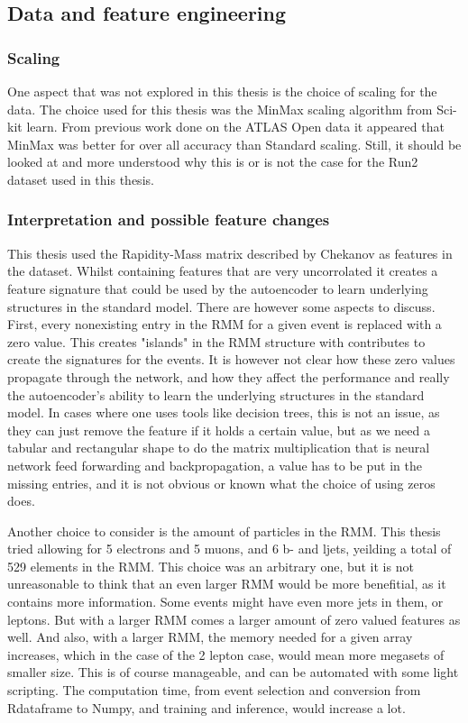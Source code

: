 \subsection*{Data and feature engineering}
\subsubsection*{Scaling}
One aspect that was not explored in this thesis is the choice of scaling for the data. The choice used for this 
thesis was the MinMax scaling algorithm from Sci-kit learn. From previous work done on the ATLAS Open data 
\cite{ATL-OREACH-PUB-2020-001} it appeared that MinMax was better for over all accuracy than Standard scaling.
Still, it should be looked at and more understood why this is or is not the case for the Run2 dataset used in this 
thesis. 

\subsubsection*{Interpretation and possible feature changes}
This thesis used the Rapidity-Mass matrix described by Chekanov\cite{Chekanov_2019} as features in the dataset. 
Whilst containing features that are very uncorrolated it creates a feature signature that could be used by 
the autoencoder to learn underlying structures in the standard model. There are however some aspects to discuss. 
First, every nonexisting entry in the RMM for a given event is replaced with a zero value. This creates 
"islands" in the RMM structure with contributes to create the signatures for the events. It is however not clear 
how these zero values propagate through the network, and how they affect the performance and really the autoencoder's 
ability to learn the underlying structures in the standard model. In cases where one uses tools like decision trees, 
this is not an issue, as they can just remove the feature if it holds a certain value, but as we need a tabular and 
rectangular shape to do the matrix multiplication that is neural network feed forwarding and backpropagation, a value
has to be put in the missing entries, and it is not obvious or known what the choice of using zeros does. \par 
Another choice to consider is the amount of particles in the RMM. This thesis tried allowing for 5 electrons and 5 muons, 
and 6 b- and ljets, yeilding a total of 529 elements in the RMM. This choice was an arbitrary one, but it is not 
unreasonable to think that an even larger RMM would be more benefitial, as it contains more information. Some 
events might have even more jets in them, or leptons. But with a larger RMM comes a larger amount of zero valued 
features as well. And also, with a larger RMM, the memory needed for a given array increases, which in the case of
the 2 lepton case, would mean more megasets of smaller size. This is of course manageable, and can be automated with 
some light scripting. The computation time, from event selection and conversion from Rdataframe to Numpy, and training 
and inference, would increase a lot. \par 





